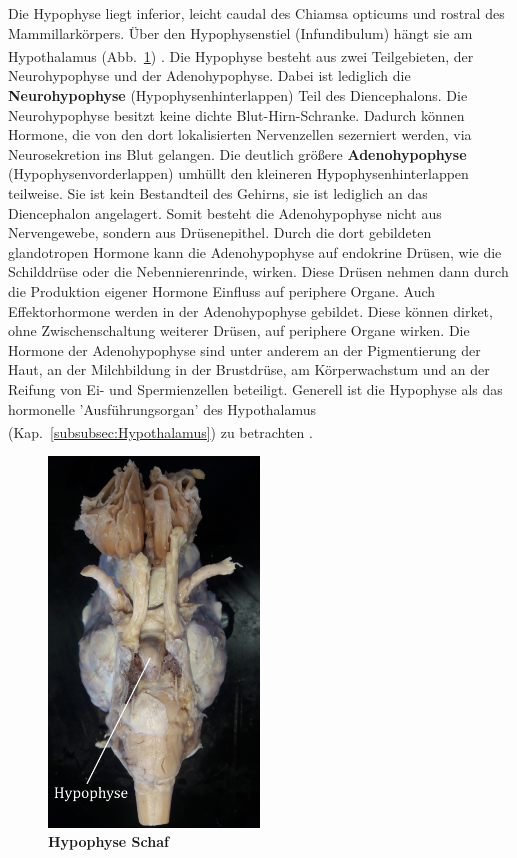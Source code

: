 \documentclass[12pt,a4paper,pdftex]{article}
\begin{document}
Die Hypophyse liegt inferior, leicht caudal des Chiamsa opticums und rostral des Mammillarkörpers. Über den Hypophysenstiel (Infundibulum) hängt sie am Hypothalamus (Abb.~\ref{fig:hypophyse}) \textsuperscript{\cite[4]{trepel2011neuroanatomie}}. Die Hypophyse besteht aus zwei Teilgebieten, der Neurohypophyse und der Adenohypophyse. Dabei ist lediglich die \textbf{Neurohypophyse} (Hypophysenhinterlappen) Teil des Diencephalons. Die Neurohypophyse besitzt keine dichte Blut-Hirn-Schranke. Dadurch können Hormone, die von den dort lokalisierten Nervenzellen sezerniert werden, via Neurosekretion ins Blut gelangen. Die deutlich größere \textbf{Adenohypophyse} (Hypophysenvorderlappen) umhüllt den kleineren Hypophysenhinterlappen teilweise. Sie ist kein Bestandteil des Gehirns, sie ist lediglich an das Diencephalon angelagert. Somit besteht die Adenohypophyse nicht aus Nervengewebe, sondern aus Drüsenepithel. Durch die dort gebildeten glandotropen Hormone kann die Adenohypophyse auf endokrine Drüsen, wie die Schilddrüse oder die Nebennierenrinde, wirken. Diese Drüsen nehmen dann durch die Produktion eigener Hormone  Einfluss auf periphere Organe. Auch Effektorhormone werden in der Adenohypophyse gebildet. Diese können dirket, ohne Zwischenschaltung weiterer Drüsen, auf periphere Organe wirken. Die Hormone der Adenohypophyse sind unter anderem an der Pigmentierung der Haut, an der Milchbildung in der Brustdrüse, am Körperwachstum und an der Reifung von Ei- und Spermienzellen beteiligt. Generell ist die Hypophyse als das hormonelle 'Ausführungsorgan' des Hypothalamus (Kap.~\ref{subsubsec:Hypothalamus}) zu betrachten  \textsuperscript{\cite[8]{trepel2011neuroanatomie}}.

\begin{figure}[H]
    \centering
    \includegraphics[width=0.5\textwidth]{pictures/Bilder_Jule/Schaf/Aussenansicht/Hypophyse.png}
    \caption[Hypophyse Schaf]{\textbf{Hypophyse Schaf}}
    \label{fig:hypophyse}
\end{figure}
\end{document}
